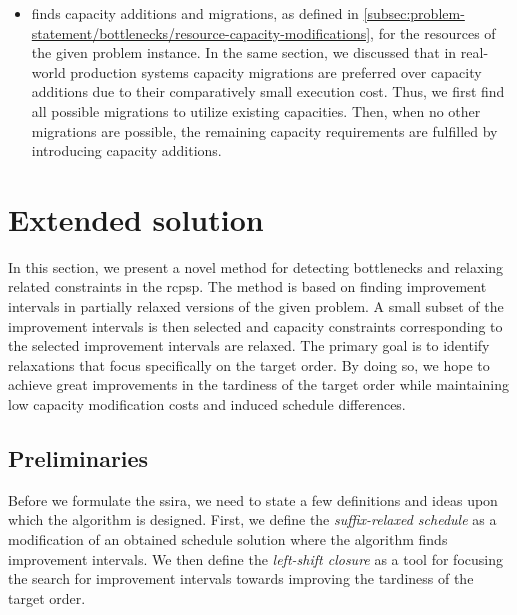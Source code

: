 \begin{itemize}
    \item {}
        finds capacity additions and migrations,
        as defined in \cref{subsec:problem-statement/bottlenecks/resource-capacity-modifications},
        for the resources of the given problem instance.
        In the same section,
        we discussed that in real-world production systems
        capacity migrations are preferred over capacity additions due to their comparatively small execution cost.
        Thus, we first find all possible migrations to utilize existing capacities.
        Then, when no other migrations are possible, the remaining capacity requirements are fulfilled
        by introducing capacity additions.
\end{itemize}

\section{Extended solution} \label{sec:solution-apporach/extended-solution}

In this section, we present a novel method for detecting bottlenecks
and relaxing related constraints in the \ac{rcpsp}.
The method is based on finding improvement intervals
in partially relaxed versions of the given problem.
A small subset of the improvement intervals is then selected and capacity constraints
corresponding to the selected improvement intervals are relaxed.
The primary goal is to identify relaxations that focus specifically on the target order.
By doing so, we hope to achieve great improvements in the tardiness of the target order
while maintaining low capacity modification costs and induced schedule differences.

\subsection{Preliminaries} \label{subsec:solution-approach/extended-solutin/preliminaries}

Before we formulate the \acl{ssira},
we need to state a few definitions and ideas upon which the algorithm is designed.
First, we define the \emph{suffix-relaxed schedule} as a modification of an obtained schedule solution
where the algorithm finds improvement intervals.
We then define the \emph{left-shift closure} as a tool
for focusing the search for improvement intervals towards improving the tardiness of the target order.

